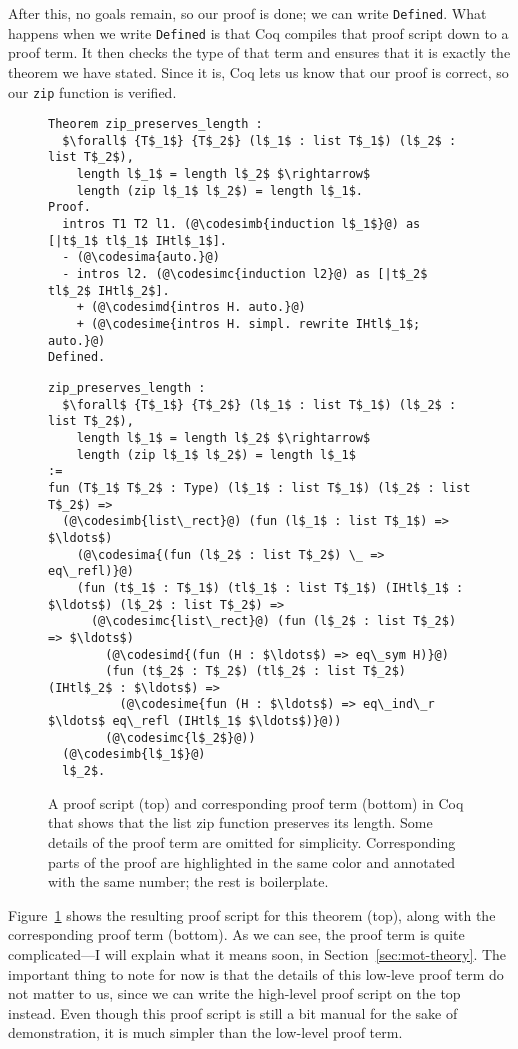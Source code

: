 After this, no goals remain, so our proof is done; we can write \lstinline{Defined}.
What happens when we write \lstinline{Defined} is that Coq compiles that proof script down to a proof term.
It then checks the type of that term and ensures that it is exactly the theorem we have stated.
Since it is, Coq lets us know that our proof is correct, so our \lstinline{zip} function is verified.

\begin{figure}
\begin{lstlisting}
Theorem zip_preserves_length :
  $\forall$ {T$_1$} {T$_2$} (l$_1$ : list T$_1$) (l$_2$ : list T$_2$),
    length l$_1$ = length l$_2$ $\rightarrow$
    length (zip l$_1$ l$_2$) = length l$_1$.
Proof.
  intros T1 T2 l1. (@\codesimb{induction l$_1$}@) as [|t$_1$ tl$_1$ IHtl$_1$].
  - (@\codesima{auto.}@)
  - intros l2. (@\codesimc{induction l2}@) as [|t$_2$ tl$_2$ IHtl$_2$].
    + (@\codesimd{intros H. auto.}@)
    + (@\codesime{intros H. simpl. rewrite IHtl$_1$; auto.}@)
Defined.
\end{lstlisting}
\begin{lstlisting}
zip_preserves_length :
  $\forall$ {T$_1$} {T$_2$} (l$_1$ : list T$_1$) (l$_2$ : list T$_2$),
    length l$_1$ = length l$_2$ $\rightarrow$
    length (zip l$_1$ l$_2$) = length l$_1$
:=
fun (T$_1$ T$_2$ : Type) (l$_1$ : list T$_1$) (l$_2$ : list T$_2$) =>
  (@\codesimb{list\_rect}@) (fun (l$_1$ : list T$_1$) => $\ldots$)
    (@\codesima{(fun (l$_2$ : list T$_2$) \_ => eq\_refl)}@)
    (fun (t$_1$ : T$_1$) (tl$_1$ : list T$_1$) (IHtl$_1$ : $\ldots$) (l$_2$ : list T$_2$) =>
      (@\codesimc{list\_rect}@) (fun (l$_2$ : list T$_2$) => $\ldots$)
        (@\codesimd{(fun (H : $\ldots$) => eq\_sym H)}@)
        (fun (t$_2$ : T$_2$) (tl$_2$ : list T$_2$) (IHtl$_2$ : $\ldots$) =>
          (@\codesime{fun (H : $\ldots$) => eq\_ind\_r $\ldots$ eq\_refl (IHtl$_1$ $\ldots$)}@))
        (@\codesimc{l$_2$}@))
  (@\codesimb{l$_1$}@)
  l$_2$.
\end{lstlisting}
\caption{A proof script (top) and corresponding proof term (bottom) in Coq that shows that the list zip function preserves its length.
Some details of the proof term are omitted for simplicity.
Corresponding parts of the proof are highlighted in the same color and annotated with the same number; the rest is boilerplate.}
\label{fig:zip-proof}
\end{figure}

Figure~\ref{fig:zip-proof} shows the resulting proof script for this theorem (top), along with the corresponding proof term (bottom).
As we can see, the proof term is quite complicated---I will explain what it means soon, in Section~\ref{sec:mot-theory}.
The important thing to note for now is that  the details of this low-leve proof term do not matter to us,
since we can write the high-level proof script on the top instead.
Even though this proof script is still a bit manual for the sake of demonstration,
it is much simpler than the low-level proof term.

